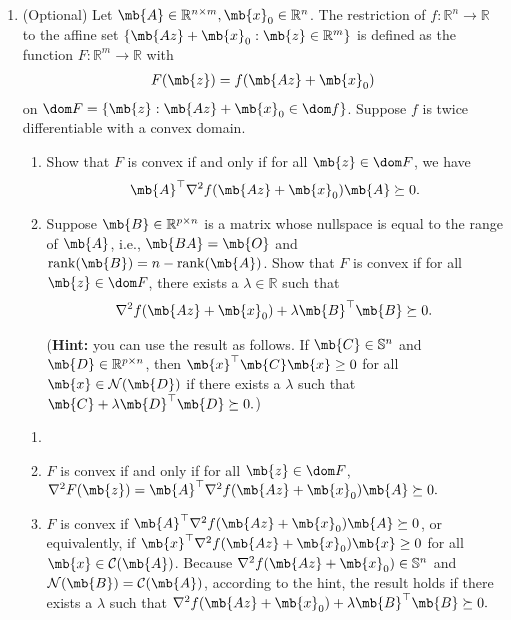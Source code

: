 \begin{exercise}
\begin{enumerate}
    \item (Optional) Let $\mb{A}\in \mathbb{R}^{n\times m},\mb{x}_0\in \mathbb{R}^n$. The restriction of $f:\mathbb{R}^n\rightarrow\mathbb{R}$ to the affine set $\{\mb{Az}+\mb{x}_0:\mb{z}\in\mathbb{R}^m\}$ is defined as the function $F:\mathbb{R}^m\rightarrow\mathbb{R}$ with
      \begin{align*}
        F(\mb{z})=f(\mb{Az}+\mb{x}_0)
      \end{align*}
      on $\dom F=\{\mb{z}:\mb{Az}+\mb{x}_0\in\dom f\}$. Suppose $f$ is twice differentiable with a convex domain.
      \begin{enumerate}
        \item Show that $F$ is convex if and only if for all $\mb{z}\in\dom F$, we have
          \begin{align*}
            \mb{A}^\top\nabla^2f(\mb{Az}+\mb{x}_0)\mb{A}\succeq 0.
          \end{align*}
        \item Suppose $\mb{B}\in\mathbb{R}^{p\times n}$ is a matrix whose nullspace is equal to the range of $\mb{A}$, i.e., $\mb{BA}=\mb{O}$ and $\operatorname{rank} (\mb{B})=n-\operatorname{rank}(\mb{A})$. Show that $F$ is convex if for all $\mb{z}\in\dom F$, there exists a $\lambda\in\mathbb{R}$ such that
          \begin{align*}
            \nabla^2f(\mb{Az}+\mb{x}_0)+\lambda\mb{B}^\top\mb{B}\succeq 0.
          \end{align*}
          
          (\textbf{Hint:} you can use the result as follows. If $\mb{C}\in\mathbb{S}^n$ and $\mb{D}\in\mathbb{R}^{p\times n}$, then $\mb{x}^\top\mb{C}\mb{x}\geq 0$ for all $\mb{x}\in\mathcal{N}(\mb{D})$ if there exists a $\lambda$ such that $\mb{C}+\lambda\mb{D}^\top\mb{D}\succeq 0.$)
      \end{enumerate}
      
      \begin{solution}
        \begin{enumerate}
          \item []
          \item $F$ is convex if and only if for all $\mb{z}\in\dom F$, $\nabla^2F(\mb{z}) = \mb{A}^\top\nabla^2f(\mb{Az}+\mb{x}_0)\mb{A}\succeq 0.$
          \item $F$ is convex if $\mb{A}^\top\nabla^2f(\mb{Az}+\mb{x}_0)\mb{A}\succeq 0$, or equivalently, if $\mb{x}^\top\nabla^2f(\mb{Az}+\mb{x}_0)\mb{x}\geq 0$ for all $\mb{x}\in\mathcal{C}(\mb{A})$. Because $\nabla^2f(\mb{Az}+\mb{x}_0)\in \mathbb{S}^n$ and $\mathcal{N}(\mb{B}) = \mathcal{C}(\mb{A})$, according to the hint, the result holds if there exists a $\lambda$ such that $\nabla^2f(\mb{Az}+\mb{x}_0)+\lambda\mb{B}^\top\mb{B}\succeq 0.$
            \qedhere
        \end{enumerate}
      \end{solution}
      

\end{enumerate}
\end{exercise}
